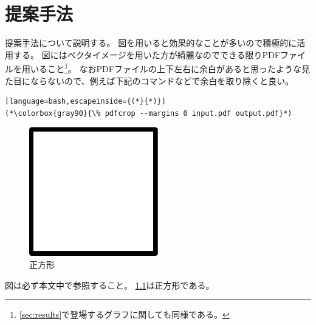 \chapter{提案手法}\label{ch:proposedsytem}

提案手法について説明する。
図を用いると効果的なことが多いので積極的に活用する。
図にはベクタイメージを用いた方が綺麗なのでできる限りPDFファイルを用いること\footnote{\cref{sec:results}で登場するグラフに関しても同様である。}。
なおPDFファイルの上下左右に余白があると思ったような見た目にならないので、例えば下記のコマンドなどで余白を取り除くと良い。

\begin{lstlisting}[language=bash,escapeinside={(*}{*)}]
(*\colorbox{gray90}{\% pdfcrop --margins 0 input.pdf output.pdf}*)
\end{lstlisting}

\begin{figure}[ht]
  \centering
  \includegraphics[width=0.5\textwidth]{examples/figures/square}
  \caption{正方形}\label{fig:square}
\end{figure}

図は必ず本文中で参照すること。
\cref{fig:square}は正方形である。

